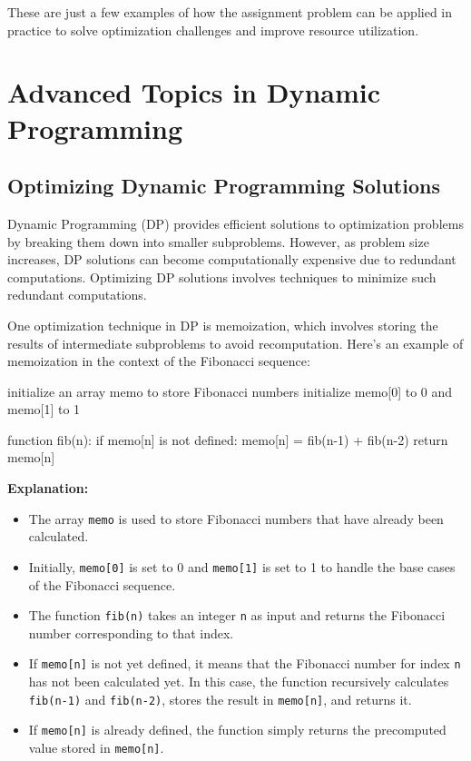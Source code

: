 \documentclass[12pt]{book} %
\begin{document}
These are just a few examples of how the assignment problem can be applied in practice to solve optimization challenges and improve resource utilization.

\section{Advanced Topics in Dynamic Programming}

\subsection{Optimizing Dynamic Programming Solutions}

Dynamic Programming (DP) provides efficient solutions to optimization problems by breaking them down into smaller subproblems. However, as problem size increases, DP solutions can become computationally expensive due to redundant computations. Optimizing DP solutions involves techniques to minimize such redundant computations.

One optimization technique in DP is memoization, which involves storing the results of intermediate subproblems to avoid recomputation. Here's an example of memoization in the context of the Fibonacci sequence:
\FloatBarrier
\begin{algorithm}
initialize an array memo to store Fibonacci numbers
initialize memo[0] to 0 and memo[1] to 1

function fib(n):
    if memo[n] is not defined:
        memo[n] = fib(n-1) + fib(n-2)
    return memo[n]  
\end{algorithm}
\FloatBarrier
\textbf{Explanation:}
\begin{itemize}
    \item The array \texttt{memo} is used to store Fibonacci numbers that have already been calculated.
    \item Initially, \texttt{memo[0]} is set to 0 and \texttt{memo[1]} is set to 1 to handle the base cases of the Fibonacci sequence.
    \item The function \texttt{fib(n)} takes an integer \texttt{n} as input and returns the Fibonacci number corresponding to that index.
    \item If \texttt{memo[n]} is not yet defined, it means that the Fibonacci number for index \texttt{n} has not been calculated yet. In this case, the function recursively calculates \texttt{fib(n-1)} and \texttt{fib(n-2)}, stores the result in \texttt{memo[n]}, and returns it.
    \item If \texttt{memo[n]} is already defined, the function simply returns the precomputed value stored in \texttt{memo[n]}.
\end{itemize}
\end{document}
